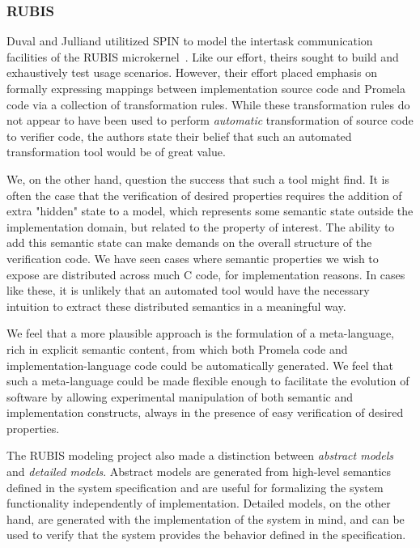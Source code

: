 \subsubsection{RUBIS}

Duval and Julliand utilitized SPIN to model the intertask communication
facilities of the RUBIS microkernel~\cite{RUBIS-verify}.  Like our effort,
theirs sought to build and exhaustively test usage scenarios.  However,
their effort placed emphasis on formally expressing mappings between
implementation source code and Promela code via a collection of
transformation rules.  While these transformation rules do not appear to
have been used to perform {\it automatic} transformation of source code
to verifier code, the authors state their belief that such an automated
transformation tool would be of great value.

We, on the other hand, question the success that such a tool might find.
It is often the case that the verification of desired properties requires
the addition of extra "hidden" state to a model, which represents some
semantic state outside the implementation domain, but related to the
property of interest.  The ability to add this semantic state can make
demands on the overall structure of the verification code.  We have seen
cases where semantic properties we wish to expose are distributed
across much C code, for implementation reasons.  In cases like these,
it is unlikely that an automated tool would have the necessary intuition
to extract these distributed semantics in a meaningful way.

We feel that a more plausible approach is the formulation of a
meta-language, rich in explicit semantic content, from which both
%
Promela code and implementation-language code could be automatically
generated.  We feel that such a meta-language could be made flexible
enough to facilitate the evolution of software by allowing experimental
manipulation of both semantic and implementation constructs, always in
the presence of easy verification of desired properties.

The RUBIS modeling project also made a distinction between {\it
abstract models} and {\it detailed models}.  Abstract models are
generated from high-level semantics defined in the system
specification and are useful for formalizing the system functionality
independently of implementation.  Detailed models, on the other hand,
are generated with the implementation of the system in mind, and can
be used to verify that the system provides the behavior defined in the
specification.

